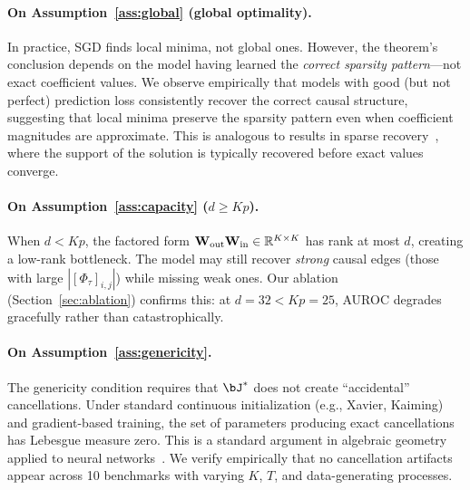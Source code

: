 \paragraph{On Assumption~\ref{ass:global} (global optimality).}
In practice, SGD finds local minima, not global ones. However, the
theorem's conclusion depends on the model having learned the
\emph{correct sparsity pattern}---not exact coefficient values. We
observe empirically that models with good (but not perfect) prediction
loss consistently recover the correct causal structure, suggesting
that local minima preserve the sparsity pattern even when coefficient
magnitudes are approximate. This is analogous to results in sparse
recovery~\citep{zheng2018dags}, where the support of the solution is
typically recovered before exact values converge.

\paragraph{On Assumption~\ref{ass:capacity} ($d \geq Kp$).}
When $d < Kp$, the factored form $\mathbf{W}_{\text{out}} \mathbf{W}_{\text{in}}
\in \mathbb{R}^{K \times K}$ has rank at most $d$, creating a low-rank
bottleneck. The model may still recover \emph{strong} causal edges
(those with large $|[\Phi_\tau]_{i,j}|$) while missing weak ones.
Our ablation (Section~\ref{sec:ablation}) confirms this: at
$d = 32 < Kp = 25$, AUROC degrades gracefully rather than
catastrophically.

\paragraph{On Assumption~\ref{ass:genericity}.}
The genericity condition requires that $\bJ^*$ does not create
``accidental'' cancellations. Under standard continuous
initialization (e.g., Xavier, Kaiming) and gradient-based training,
the set of parameters producing exact cancellations has Lebesgue
measure zero. This is a standard argument in algebraic geometry
applied to neural networks~\citep{zheng2018dags}. We verify
empirically that no cancellation artifacts appear across 10
benchmarks with varying $K$, $T$, and data-generating processes.

